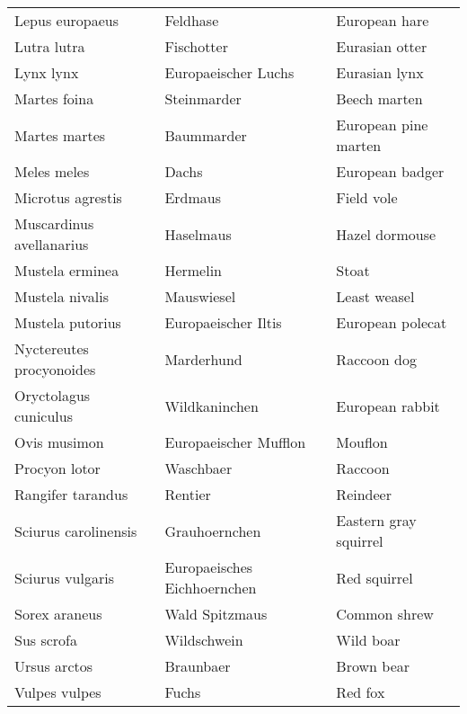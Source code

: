 \begin{table}[!ht]
\begin{tabular}{l|ll}
		Lepus europaeus          & Feldhase                    & European hare         \\
		Lutra lutra              & Fischotter                  & Eurasian otter        \\
		Lynx lynx                & Europaeischer Luchs         & Eurasian lynx         \\
		Martes foina             & Steinmarder                 & Beech marten          \\
		\hline
		Martes martes            & Baummarder                  & European pine marten  \\
		Meles meles              & Dachs                       & European badger       \\
		Microtus agrestis        & Erdmaus                     & Field vole            \\
		Muscardinus avellanarius & Haselmaus                   & Hazel dormouse        \\
		Mustela erminea          & Hermelin                    & Stoat                 \\
		\hline
		Mustela nivalis          & Mauswiesel                  & Least weasel          \\
		Mustela putorius         & Europaeischer Iltis         & European polecat      \\
		Nyctereutes procyonoides & Marderhund                  & Raccoon dog           \\
		Oryctolagus cuniculus    & Wildkaninchen               & European rabbit       \\
		Ovis musimon             & Europaeischer Mufflon       & Mouflon               \\
		\hline
		Procyon lotor            & Waschbaer                   & Raccoon               \\
		Rangifer tarandus        & Rentier                     & Reindeer              \\
		Sciurus carolinensis     & Grauhoernchen               & Eastern gray squirrel \\
		Sciurus vulgaris         & Europaeisches Eichhoernchen & Red squirrel          \\
		Sorex araneus            & Wald Spitzmaus              & Common shrew          \\
		\hline
		Sus scrofa               & Wildschwein                 & Wild boar             \\
		Ursus arctos             & Braunbaer                   & Brown bear            \\
		Vulpes vulpes            & Fuchs                       & Red fox                
	\end{tabular}
\end{table}